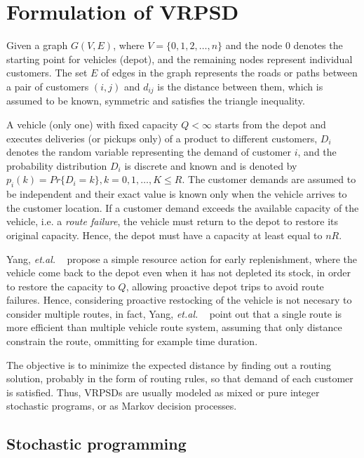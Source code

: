 \section{Formulation of VRPSD}\label{sec:Form_VRPSD}

Given a graph $G(V,E)$, where $V = \{0, 1, 2,\ldots,n\}$ and the node 0 denotes the starting point for vehicles (depot), and the remaining nodes represent individual customers. The set $E$ of edges in the graph represents the roads or paths between a pair of customers $(i,j)$ and $d_{ij}$ is the distance between them, which is assumed to be known, symmetric and satisfies the triangle inequality.

A vehicle (only one) with fixed capacity $Q < \infty$ starts from the depot and executes deliveries (or pickups only) of a product to different customers, $D_i$ denotes the random variable representing the demand of customer $i$, and the probability distribution $D_i$ is discrete and known and is denoted by $p_i(k)= Pr\{D_i=k\}, k=0,1,\ldots,K \leq R$. The customer demands are assumed to be independent and their exact value is known only when the vehicle arrives to the customer location. If a customer demand exceeds the available capacity of the vehicle, i.e. a \textit{route failure}, the vehicle must return to the depot to restore its original capacity. Hence, the depot must have a capacity at least equal to $nR$. %

Yang, \textit{et.al.} ~\cite{yang_stochastic_2000} propose a simple resource action for early replenishment, where the vehicle come back to the depot even when it has not depleted its stock, in order to restore the capacity to $Q$, allowing proactive depot trips to avoid route failures. Hence, considering proactive restocking of the vehicle is not necesary to consider multiple routes, in fact, Yang, \textit{et.al.} ~\cite{yang_stochastic_2000} point out that a single route is more efficient than multiple vehicle route system, assuming that only distance constrain the route, ommitting for example time duration.

The objective is to minimize the expected distance by finding out a routing solution, probably in the form of routing rules, so that demand of each customer is satisfied. Thus, VRPSDs are usually modeled as mixed or pure integer stochastic programs, or as Markov decision processes.


\subsection{Stochastic programming}


